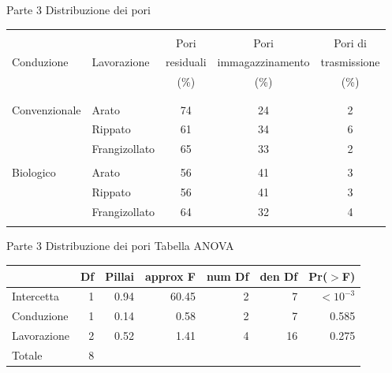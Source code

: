 \documentclass[xcolor={usenames, table, x11names}, final, 10pt]{beamer}
\begin{document}
\begin{frame}{Parte 3 \small{Distribuzione dei pori}}

  \footnotesize
  \begin{table}[hb]
    \centering
    \begin{tabular}{llccc}%
      
      \toprule
      \\
   &             & Pori    & Pori          & Pori di\\
      Conduzione & Lavorazione & residuali & immagazzinamento &
                                                                trasmissione \\ 
   &             & (\%) &  (\%) &  (\%) \\
      \\
      \midrule
      \\
      Convenzionale & Arato & 74 & 24 & 2 \\ 
   & Rippato & 61 & 34 & 6 \\ 
   & Frangizollato & 65 & 33 & 2 \\ 
   &  &  &  &  \\ 
      Biologico & Arato & 56 & 41 & 3 \\ 
   & Rippato & 56 & 41 & 3 \\ 
   & Frangizollato & 64 & 32 & 4 \\ 
      \\
      \bottomrule
    \end{tabular}
  \end{table}
\end{frame}

\begin{frame}{Parte 3 \small{Distribuzione dei pori}}
  Tabella ANOVA 
  \begin{table}[ht]
    \centering
    \begin{tabular}{lrrrrrr}
      \toprule
      & Df & Pillai & approx F & num Df & den Df & Pr($>$F) \\ 
      \midrule
      Intercetta & 1 & 0.94 & 60.45 & 2 & 7 & $<10^{-3}$ \\ 
      Conduzione & 1 & 0.14 & 0.58 & 2 & 7 & 0.585 \\ 
      Lavorazione & 2 & 0.52 & 1.41 & 4 & 16 & 0.275 \\ 
      Totale & 8 &  &  &  &  &  \\ 
      \bottomrule
    \end{tabular}
  \end{table}
\end{frame}
\end{document}
